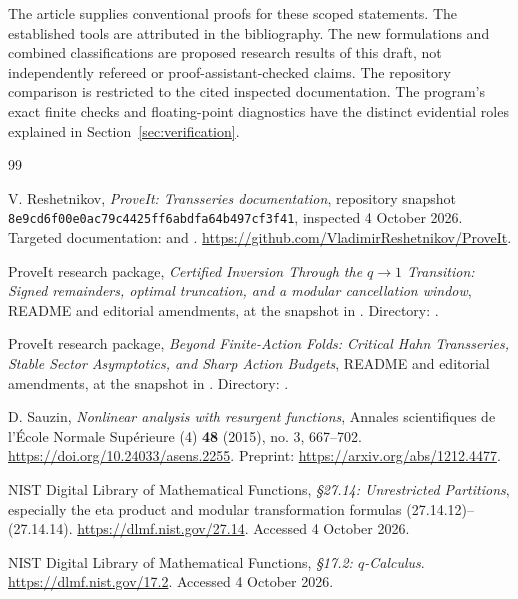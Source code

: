 \documentclass[11pt,a4paper]{article}
\numberwithin{equation}{section}
\theoremstyle{definition}\newtheorem{definition}[theorem]{Definition}
\theoremstyle{remark}\newtheorem{remark}[theorem]{Remark}
\begin{document}
The article supplies conventional proofs for these scoped statements.
The established tools are attributed in the bibliography. The new
formulations and combined classifications are proposed research results
of this draft, not independently refereed or proof-assistant-checked
claims. The repository comparison is restricted to the cited inspected
documentation. The program's exact finite checks and floating-point
diagnostics have the distinct evidential roles explained in
Section~\ref{sec:verification}.

\clearpage
\begin{thebibliography}{99}
\raggedright
{}
V. Reshetnikov, \emph{ProveIt: Transseries documentation}, repository
snapshot \texttt{8e9cd6f00e0ac79c4425ff6abdfa64b497cf3f41},
inspected 4 October 2026. Targeted documentation:
 and
.
\url{https://github.com/VladimirReshetnikov/ProveIt}.

ProveIt research package, \emph{Certified Inversion Through the
$q\to1$ Transition: Signed remainders, optimal truncation, and a modular
cancellation window}, README and editorial amendments, at the snapshot
in \cite{repo}. Directory:
.

ProveIt research package, \emph{Beyond Finite-Action Folds: Critical Hahn
Transseries, Stable Sector Asymptotics, and Sharp Action Budgets}, README
and editorial amendments, at the snapshot in \cite{repo}. Directory:
.

D. Sauzin, \emph{Nonlinear analysis with resurgent functions},
Annales scientifiques de l'\'Ecole Normale Sup\'erieure (4)
\textbf{48} (2015), no. 3, 667--702.
\url{https://doi.org/10.24033/asens.2255}.
Preprint: \url{https://arxiv.org/abs/1212.4477}.

NIST Digital Library of Mathematical Functions,
\emph{\S27.14: Unrestricted Partitions}, especially the eta product and
modular transformation formulas (27.14.12)--(27.14.14).
\url{https://dlmf.nist.gov/27.14}. Accessed 4 October 2026.

NIST Digital Library of Mathematical Functions,
\emph{\S17.2: $q$-Calculus}.
\url{https://dlmf.nist.gov/17.2}. Accessed 4 October 2026.


\end{thebibliography}
\end{document}
